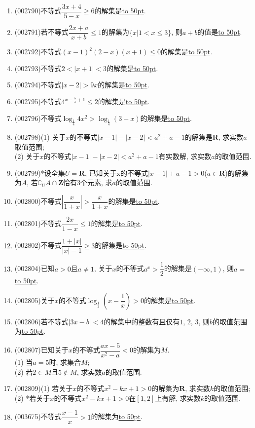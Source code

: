 \documentclass[10pt,a4paper]{article}
\newcommand{\blank}[1]{\underline{\hbox to #1pt{}}}
\begin{document}
\begin{enumerate}[1.]
\item {\tiny (002790)}不等式$\dfrac{3x+4}{5-x}\ge 6$的解集是\blank{50}.
\item {\tiny (002791)}若不等式$\dfrac{2x+a}{x+b}\le 1$的解集为$\{x|1<x\le 3\}$, 则$a+b$的值是\blank{50}.
\item {\tiny (002792)}不等式$(x-1)^2(2-x)(x+1)\le 0$的解集是\blank{50}.
\item {\tiny (002793)}不等式$2<|x+1|<3$的解集是\blank{50}.
\item {\tiny (002794)}不等式$|x-2|>9x$的解集是\blank{50}.
\item {\tiny (002795)}不等式$4^{x-\frac 5x+1}\le 2$的解集是\blank{50}.
\item {\tiny (002796)}不等式$\log_{\frac 14}4{x^2}>\log_{\frac 14}(3-x)$的解集是\blank{50}.
\item {\tiny (002798)}(1) 关于$x$的不等式$|x-1|-|x-2|<a^2+a-1$的解集是$\mathbf{R}$, 求实数$a$取值范围;\\
(2) 关于$x$的不等式$|x-1|-|x-2|<a^2+a-1$有实数解, 求实数$a$的取值范围.
\item {\tiny (002799)}*设全集$U=\mathbf{R}$, 已知关于x的不等式$|x-1|+a-1>0$($a\in \mathbf{R}$)的解集为$A$, 若$\complement_U A\cap \mathbf{Z}$恰有$3$个元素, 求$a$的取值范围.
\item {\tiny (002800)}不等式$|\dfrac x{1+x}|>\dfrac x{1+x}$的解集是\blank{50}.
\item {\tiny (002801)}不等式$\dfrac{2x}{1-x}\le 1$的解集是\blank{50}.
\item {\tiny (002802)}不等式$\dfrac{1+|x|}{|x|-1}\ge 3$的解集是\blank{50}.
\item {\tiny (002804)}已知$a>0$且$a\ne 1$, 关于$x$的不等式$a^x>\dfrac 12$的解集是$(-\infty ,1)$, 则$a=$\blank{50}.
\item {\tiny (002805)}关于$x$的不等式$\log_{\frac 12}(x-\dfrac 1x)>0$的解集是\blank{50}.
\item {\tiny (002806)}若不等式$|3x-b|<4$的解集中的整数有且仅有$1$, $2$, $3$, 则$b$的取值范围为\blank{50}.
\item {\tiny (002807)}已知关于$x$的不等式$\dfrac{ax-5}{x^2-a}<0$的解集为$M$.\\
(1) 当$a=5$时, 求集合$M$;\\
(2) 若$2\in M$且$5\notin M$, 求实数$a$的取值范围.
\item {\tiny (002809)}(1) 若关于$x$的不等式$x^2-kx+1>0$的解集为$\mathbf{R}$, 求实数$k$的取值范围;\\
(2) *若关于$x$的不等式$x^2-kx+1>0$在$[1,2]$上有解, 求实数$k$的取值范围.
\item {\tiny (003675)}不等式$\dfrac{x-1}{x}>1$的解集为\blank{50}.

\end{enumerate}
\end{document}
